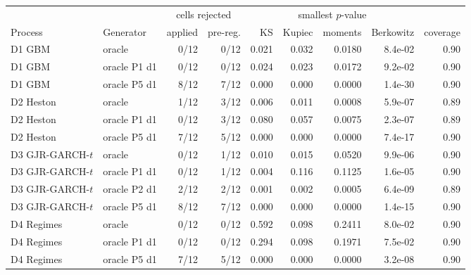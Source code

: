 \begin{tabular}{llrrrrrrr}
\toprule
& & \multicolumn{2}{c}{cells rejected} & \multicolumn{4}{c}{smallest $p$-value} & \\
\cmidrule(lr){3-4}\cmidrule(lr){5-8}
Process & Generator & applied & pre-reg. & KS & Kupiec & moments & Berkowitz & coverage \\
\midrule
D1 GBM & oracle & 0/12 & 0/12 & 0.021 & 0.032 & 0.0180 & 8.4e-02 & 0.90 \\
D1 GBM & oracle P1 d1 & 0/12 & 0/12 & 0.024 & 0.023 & 0.0172 & 9.2e-02 & 0.90 \\
D1 GBM & oracle P5 d1 & 8/12 & 7/12 & 0.000 & 0.000 & 0.0000 & 1.4e-30 & 0.90 \\
D2 Heston & oracle & 1/12 & 3/12 & 0.006 & 0.011 & 0.0008 & 5.9e-07 & 0.89 \\
D2 Heston & oracle P1 d1 & 0/12 & 3/12 & 0.080 & 0.057 & 0.0075 & 2.3e-07 & 0.89 \\
D2 Heston & oracle P5 d1 & 7/12 & 5/12 & 0.000 & 0.000 & 0.0000 & 7.4e-17 & 0.90 \\
D3 GJR-GARCH-$t$ & oracle & 0/12 & 1/12 & 0.010 & 0.015 & 0.0520 & 9.9e-06 & 0.90 \\
D3 GJR-GARCH-$t$ & oracle P1 d1 & 0/12 & 1/12 & 0.004 & 0.116 & 0.1125 & 1.6e-05 & 0.90 \\
D3 GJR-GARCH-$t$ & oracle P2 d1 & 2/12 & 2/12 & 0.001 & 0.002 & 0.0005 & 6.4e-09 & 0.89 \\
D3 GJR-GARCH-$t$ & oracle P5 d1 & 8/12 & 7/12 & 0.000 & 0.000 & 0.0000 & 1.4e-15 & 0.90 \\
D4 Regimes & oracle & 0/12 & 0/12 & 0.592 & 0.098 & 0.2411 & 8.0e-02 & 0.90 \\
D4 Regimes & oracle P1 d1 & 0/12 & 0/12 & 0.294 & 0.098 & 0.1971 & 7.5e-02 & 0.90 \\
D4 Regimes & oracle P5 d1 & 7/12 & 5/12 & 0.000 & 0.000 & 0.0000 & 3.2e-08 & 0.90 \\
\bottomrule
\end{tabular}

